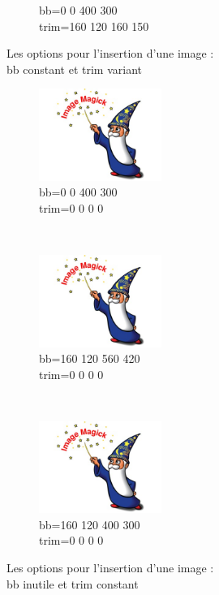 \documentclass[french]{article}
\begin{document}
\begin{figure}[h]
\begin{subfigure}[b]{0.3\textwidth}
        \caption{bb=0 0 400 300\\trim=160 120 160 150}
        \label{essai_9}
    \end{subfigure}
    \caption{Les options pour l'insertion d'une image :\\bb constant et trim variant}%
    \label{bb constant et trim variant}

\end{figure}


\begin{figure}[h]
    \centering
    \begin{subfigure}[b]{0.3\textwidth}
        \includegraphics[bb=0 0 400 300,trim=0 0 0 0,width=4cm,height=3cm,clip=true]{test.jpg}
        \caption{bb=0 0 400 300\\trim=0 0 0 0}
        \label{essai_a}
    \end{subfigure}
    ~
    \begin{subfigure}[b]{0.3\textwidth}
        \includegraphics[bb=160 120 560 420,trim=0 0 0 0,width=4cm,height=3cm,clip=true]{test.jpg}
        \caption{bb=160 120 560 420\\trim=0 0 0 0}
        \label{essai_2}
    \end{subfigure}
    ~
    \begin{subfigure}[b]{0.3\textwidth}
        \includegraphics[bb=160 120 400 300,trim=0 0 0 0,width=4cm,height=3cm,clip=true]{test.jpg}
        \caption{bb=160 120 400 300\\trim=0 0 0 0}
        \label{essai_3}
    \end{subfigure}
    \caption{Les options pour l'insertion d'une image :\\bb inutile et trim constant}%
    \label{bb inutile et trim constant}

\end{figure}
\end{document}
